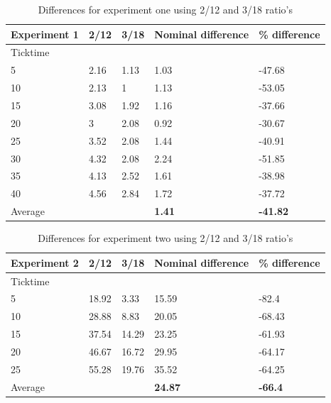 \begin{table}[!htbp]
\begin{tabular}{| l | l | l | l | l |}
\hline
Experiment 1 & 2/12 & 3/18 & Nominal difference & \% difference \\ \hline
Ticktime &&&& \\ \hline
5 & 2.16 & 1.13 & 1.03 & -47.68 \\ \hline
10 & 2.13 & 1 & 1.13 & -53.05 \\ \hline
15 & 3.08 & 1.92 & 1.16 & -37.66 \\ \hline
20 & 3 & 2.08 & 0.92 & -30.67 \\ \hline
25 & 3.52 & 2.08 & 1.44 & -40.91 \\ \hline
30 & 4.32 & 2.08 & 2.24 & -51.85 \\ \hline
35 & 4.13 & 2.52 & 1.61 & -38.98 \\ \hline
40 & 4.56 & 2.84 & 1.72 & -37.72 \\ \hline \hline
Average &&& \textbf{1.41} & \textbf{-41.82} \\ \hline
\end{tabular}
\caption{Differences for experiment one using 2/12 and 3/18 ratio's}
\label{table:Diff23ex1}
\end{table}

\begin{table}[!htbp]
\begin{tabular}{| l | l | l | l | l |}
\hline
Experiment 2 & 2/12 & 3/18 & Nominal difference & \% difference \\ \hline
Ticktime &&&& \\ \hline
5 & 18.92 & 3.33 & 15.59 & -82.4 \\ \hline
10 & 28.88 & 8.83 & 20.05 & -68.43 \\ \hline
15 & 37.54 & 14.29 & 23.25 & -61.93 \\ \hline
20 & 46.67 & 16.72 & 29.95 & -64.17 \\ \hline
25 & 55.28 & 19.76 & 35.52 & -64.25 \\ \hline \hline
Average &&& \textbf{24.87} & \textbf{-66.4} \\ \hline
\end{tabular}
\caption{Differences for experiment two using 2/12 and 3/18 ratio's}
\label{table:Diff23ex2}
\end{table}

